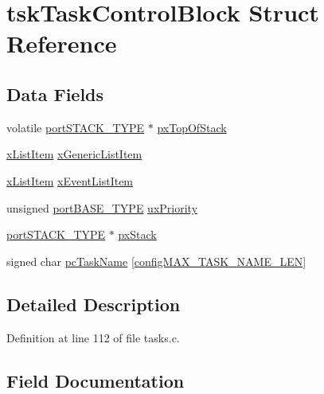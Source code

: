 \hypertarget{structtskTaskControlBlock}{}\section{tsk\+Task\+Control\+Block Struct Reference}
\label{structtskTaskControlBlock}
\subsection*{Data Fields}
\begin{DoxyCompactItemize}
\item 
volatile \hyperlink{portmacro_8h_ab0a294066ac7369b8f59a52d9491a92c}{port\+S\+T\+A\+C\+K\+\_\+\+T\+Y\+PE} $\ast$ \hyperlink{structtskTaskControlBlock_afc326fefc205c0643b866b46422dad48}{px\+Top\+Of\+Stack}
\item 
\hyperlink{list_8h_abc3e65a10b5c5f39142e64e69311797f}{x\+List\+Item} \hyperlink{structtskTaskControlBlock_a95eb5853a94644043605770f63ac9a63}{x\+Generic\+List\+Item}
\item 
\hyperlink{list_8h_abc3e65a10b5c5f39142e64e69311797f}{x\+List\+Item} \hyperlink{structtskTaskControlBlock_a9b0ee1554f116853c7631dc0b585ffdc}{x\+Event\+List\+Item}
\item 
unsigned \hyperlink{portmacro_8h_a1ebe82d24d764ae4e352f7c3a9f92c01}{port\+B\+A\+S\+E\+\_\+\+T\+Y\+PE} \hyperlink{structtskTaskControlBlock_a82357f7be508ac5d27ae7968cddde6da}{ux\+Priority}
\item 
\hyperlink{portmacro_8h_ab0a294066ac7369b8f59a52d9491a92c}{port\+S\+T\+A\+C\+K\+\_\+\+T\+Y\+PE} $\ast$ \hyperlink{structtskTaskControlBlock_a4586e39b121c224e22e0e84b04b8e3f3}{px\+Stack}
\item 
signed char \hyperlink{structtskTaskControlBlock_a11d2c88aa454db44eb0cb0184958a7b0}{pc\+Task\+Name} \mbox{[}\hyperlink{FreeRTOSConfig_8h_ac388dc4041aab6997348828eb27fc1a8}{config\+M\+A\+X\+\_\+\+T\+A\+S\+K\+\_\+\+N\+A\+M\+E\+\_\+\+L\+EN}\mbox{]}
\end{DoxyCompactItemize}


\subsection{Detailed Description}


Definition at line 112 of file tasks.\+c.



\subsection{Field Documentation}
\mbox{\label{structtskTaskControlBlock_a11d2c88aa454db44eb0cb0184958a7b0}} 
